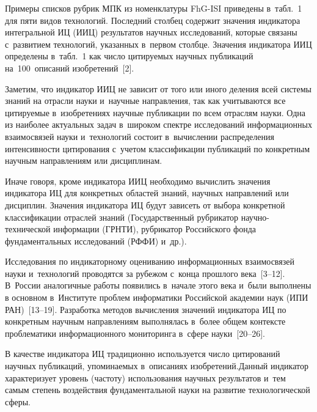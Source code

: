 \begin{multicols}{2}
Примеры 
списков рубрик МПК из номенклатуры FhG-ISI приведены в~табл.~1 для пяти 
видов технологий. Последний столбец содержит значения индикатора интегральной 
ИЦ (ИИЦ) результатов научных исследований, которые 
связаны с~развитием технологий, указанных в~первом столбце. Значения 
индикатора ИИЦ определены в~табл.~1 как число цитируемых научных 
пуб\-ли\-ка\-ций на~100~описаний изобретений~[2].
  

  
  Заметим, что индикатор ИИЦ не зависит от того или иного деления всей 
системы знаний на отрасли науки и~научные направления, так как учитываются 
все цитируемые в~изобретениях научные пуб\-ли\-ка\-ции по всем отраслям науки. 
Одна из наиболее актуальных задач в~широком спектре исследований 
информационных взаимосвязей науки и~технологий состоит в~вычислении 
распределения интенсивности цитирования с~учетом классификации пуб\-ли\-ка\-ций 
по конкретным научным направлениям или дисциплинам.
  
  Иначе говоря, кроме индикатора ИИЦ необходимо вычислить значения 
индикатора ИЦ для конкретных областей знаний, 
научных направлений или дисциплин. Значения индикатора ИЦ будут зависеть от 
выбора конкретной классификации отраслей знаний (Государственный рубрикатор 
на\-уч\-но-тех\-ни\-че\-ской 
информации (\mbox{ГРНТИ}), рубрикатор Российского фонда фундаментальных 
исследований (РФФИ) и~др.).
  
  Исследования по индикаторному оцениванию информационных взаимосвязей 
науки и~технологий проводятся за рубежом с~конца прошлого века~[3--12]. 
В~России аналогичные работы появились в~начале этого века и~были выполнены 
в основном в~Институте проблем информатики Российской
академии наук (ИПИ РАН)~[13--19]. 
Разработка методов вычисления значений индикатора ИЦ по конкретным 
научным направлениям выполнялась в~более общем контексте проблематики 
информационного мониторинга в~сфере науки~[20--26].
  
  В качестве индикатора ИЦ традиционно используется число цитирований 
научных пуб\-ли\-ка\-ций, упоминаемых в~описаниях изобретений.\linebreak Данный индикатор 
характеризует уровень (частоту) использования научных результатов и~тем самым 
степень воздействия фундаментальной науки на развитие технологической сферы.
  

\end{multicols}
